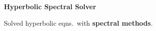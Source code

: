 \textbf{Hyperbolic Spectral Solver} \hfill {}

	\begin{items}
		\item Solved hyperbolic eqns.~with \textbf{spectral methods}.
	\end{items}